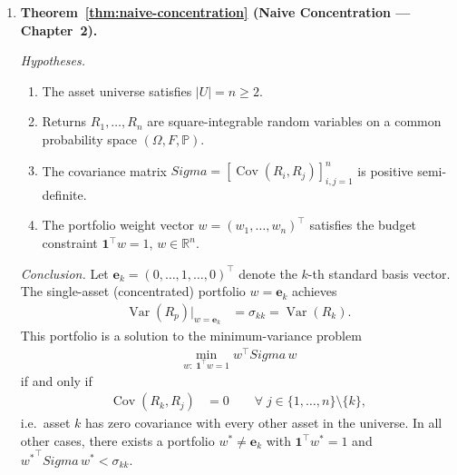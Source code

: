 \documentclass[12pt,openany]{book}
\newcommand{\R}{\mathbb{R}}
\newcommand{\Prob}{\mathbb{P}}
\newcommand{\bfw}{\mathbf{w}}
\newcommand{\bfSigma}{\boldsymbol{\Sigma}}
\newcommand{\bfe}{\mathbf{e}}
\newcommand{\bfone}{\mathbf{1}}
\newcommand{\calU}{\mathcal{U}}
\newcommand{\calF}{\mathcal{F}}
\DeclareMathOperator{\Var}{Var}
\DeclareMathOperator{\Cov}{Cov}
\numberwithin{equation}{chapter}
\theoremstyle{plain}
\theoremstyle{definition}
\theoremstyle{remark}
\def\calU{U}%
\def\mathcal#1{#1}%
\def\calF{F}%
\def\bfw{w}%
\def\bfSigma{Sigma}%
\begin{document}
\smallskip
\begin{enumerate}[label=\textbf{A\arabic*.}, leftmargin=*, widest=A2,
                  itemsep=6pt, parsep=2pt]

  \item \textbf{Theorem~\ref{thm:naive-concentration}
        (Naive Concentration — Chapter~2).}

        \emph{Hypotheses.}
        \begin{enumerate}[label=(\roman*), itemsep=2pt]
          \item The asset universe satisfies $|\calU|=n\geq 2$.
          \item Returns $R_1,\ldots,R_n$ are square-integrable random
                variables on a common probability space
                $(\Omega,\calF,\Prob)$.
          \item The covariance matrix
                $\bfSigma = [\Cov(R_i,R_j)]_{i,j=1}^n$ is
                positive semi-definite.
          \item The portfolio weight vector
                $\bfw=(w_1,\ldots,w_n)^\top$ satisfies the budget
                constraint $\bfone^\top\bfw = 1$,
                $\bfw \in \R^n$.
        \end{enumerate}

        \emph{Conclusion.}
        Let $\bfe_k = (0,\ldots,1,\ldots,0)^\top$ denote the
        $k$-th standard basis vector.  The single-asset (concentrated)
        portfolio $\bfw = \bfe_k$ achieves
        \begin{align}
          \Var(R_p)\big|_{\bfw=\bfe_k}
            &= \sigma_{kk}
             = \Var(R_k).
          \label{eq:sum-conc-var}
        \end{align}
        This portfolio is a solution to the minimum-variance problem
        \begin{align}
          \min_{\bfw:\;\bfone^\top\bfw=1}
            \bfw^\top \bfSigma\, \bfw
          \label{eq:sum-mv-prob}
        \end{align}
        if and only if
        \begin{align}
          \Cov(R_k, R_j) &= 0
          \qquad \forall\; j \in \{1,\ldots,n\} \setminus \{k\},
          \label{eq:sum-cov-zero}
        \end{align}
        i.e.\ asset $k$ has zero covariance with every other
        asset in the universe.  In all other cases, there exists
        a portfolio $\bfw^* \neq \bfe_k$ with
        $\bfone^\top\bfw^*=1$ and
        ${\bfw^*}^\top\bfSigma\,\bfw^* < \sigma_{kk}$.


\end{enumerate}
\end{document}
